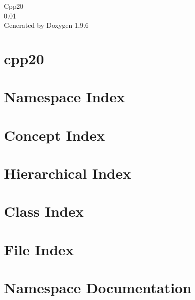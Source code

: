 \documentclass[twoside]{book}
\newcommand{\+}{\discretionary{\mbox{\scriptsize$\hookleftarrow$}}{}{}}
\newcommand{\clearemptydoublepage}{%
    \newpage{\pagestyle{empty}\cleardoublepage}%
  }
\begin{document}
  \raggedbottom
    \hypersetup{pageanchor=false,
                bookmarksnumbered=true,
                pdfencoding=unicode
               }
  \begin{titlepage}
  \vspace*{7cm}
  \begin{center}%
  {\Large Cpp20}\\
  [1ex]\large 0.\+01 \\
  \vspace*{1cm}
  {\large Generated by Doxygen 1.9.6}\\
  \end{center}
  \end{titlepage}
  \clearemptydoublepage
  \tableofcontents
  \clearemptydoublepage
  \hypersetup{pageanchor=true}
\chapter{cpp20}
\label{md__r_e_a_d_m_e}

\chapter{Namespace Index}

\chapter{Concept Index}

\chapter{Hierarchical Index}

\chapter{Class Index}

\chapter{File Index}

\chapter{Namespace Documentation}














\end{document}
